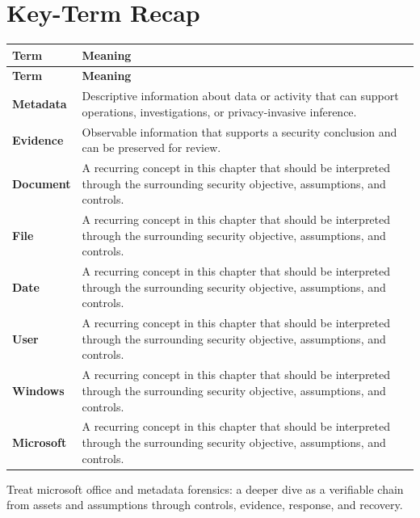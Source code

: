 \documentclass[11pt]{article}
\begin{document}
\section*{Key-Term Recap}
\begin{longtable}{>{\RaggedRight\arraybackslash}p{}>{\RaggedRight\arraybackslash}p{}}
\toprule\rowcolor{Navy}\color{white}\textbf{Term} & \color{white}\textbf{Meaning}\\\midrule
\endfirsthead
\toprule\rowcolor{Navy}\color{white}\textbf{Term} & \color{white}\textbf{Meaning}\\\midrule
\endhead
\textbf{Metadata} & Descriptive information about data or activity that can support operations, investigations, or privacy-invasive inference. \\\midrule
\textbf{Evidence} & Observable information that supports a security conclusion and can be preserved for review. \\\midrule
\textbf{Document} & A recurring concept in this chapter that should be interpreted through the surrounding security objective, assumptions, and controls. \\\midrule
\textbf{File} & A recurring concept in this chapter that should be interpreted through the surrounding security objective, assumptions, and controls. \\\midrule
\textbf{Date} & A recurring concept in this chapter that should be interpreted through the surrounding security objective, assumptions, and controls. \\\midrule
\textbf{User} & A recurring concept in this chapter that should be interpreted through the surrounding security objective, assumptions, and controls. \\\midrule
\textbf{Windows} & A recurring concept in this chapter that should be interpreted through the surrounding security objective, assumptions, and controls. \\\midrule
\textbf{Microsoft} & A recurring concept in this chapter that should be interpreted through the surrounding security objective, assumptions, and controls. \\\midrule
\bottomrule
\end{longtable}
\begin{takeawaybox}
Treat microsoft office and metadata forensics: a deeper dive as a verifiable chain from assets and assumptions through controls, evidence, response, and recovery.
\end{takeawaybox}
\end{document}
